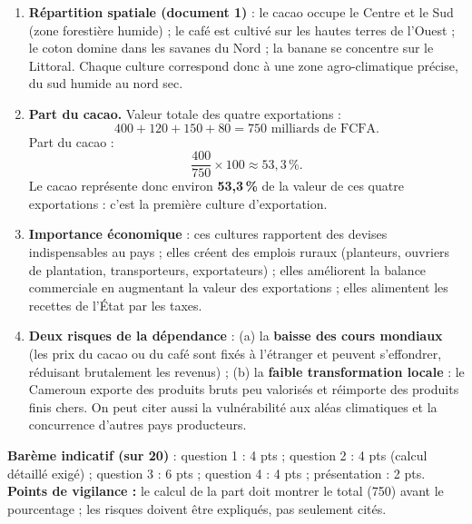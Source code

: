 \documentclass[11pt]{article}
\begin{document}
\begin{corrige}
\begin{enumerate}
\item \textbf{Répartition spatiale (document 1)} : le cacao occupe le Centre et le Sud (zone forestière humide) ; le café est cultivé sur les hautes terres de l'Ouest ; le coton domine dans les savanes du Nord ; la banane se concentre sur le Littoral. Chaque culture correspond donc à une zone agro-climatique précise, du sud humide au nord sec.
\item \textbf{Part du cacao.} Valeur totale des quatre exportations :
\[ 400 + 120 + 150 + 80 = 750 \text{ milliards de FCFA.} \]
Part du cacao :
\[ \frac{400}{750} \times 100 \approx 53,3\,\%. \]
Le cacao représente donc environ \textbf{53,3\,\%} de la valeur de ces quatre exportations : c'est la première culture d'exportation.
\item \textbf{Importance économique} : ces cultures rapportent des devises indispensables au pays ; elles créent des emplois ruraux (planteurs, ouvriers de plantation, transporteurs, exportateurs) ; elles améliorent la balance commerciale en augmentant la valeur des exportations ; elles alimentent les recettes de l'État par les taxes.
\item \textbf{Deux risques de la dépendance} : (a) la \textbf{baisse des cours mondiaux} (les prix du cacao ou du café sont fixés à l'étranger et peuvent s'effondrer, réduisant brutalement les revenus) ; (b) la \textbf{faible transformation locale} : le Cameroun exporte des produits bruts peu valorisés et réimporte des produits finis chers. On peut citer aussi la vulnérabilité aux aléas climatiques et la concurrence d'autres pays producteurs.
\end{enumerate}
\textbf{Barème indicatif (sur 20)} : question 1 : 4 pts ; question 2 : 4 pts (calcul détaillé exigé) ; question 3 : 6 pts ; question 4 : 4 pts ; présentation : 2 pts.
\textbf{Points de vigilance :} le calcul de la part doit montrer le total (750) avant le pourcentage ; les risques doivent être expliqués, pas seulement cités.
\end{corrige}
\end{document}
